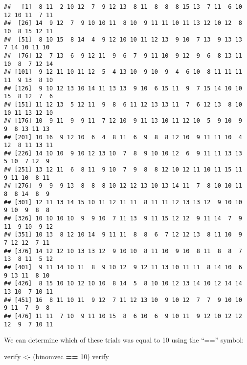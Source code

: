 \documentclass[
]{book}
\newenvironment{Shaded}{\begin{snugshade}}{\end{snugshade}}
\newcommand{\DecValTok}[1]{\textcolor[rgb]{0.00,0.00,0.81}{#1}}
\newcommand{\NormalTok}[1]{#1}
\newcommand{\OperatorTok}[1]{\textcolor[rgb]{0.81,0.36,0.00}{\textbf{#1}}}
\newcommand{\StringTok}[1]{\textcolor[rgb]{0.31,0.60,0.02}{#1}}
\begin{document}
\begin{verbatim}
##   [1]  8 11  2 10 12  7  9 12 13  8 11  8  8  8 15 13  7 11  6 10 12 10 11  7 11
##  [26] 14  9 12  7  9 10 10 11  8 10  9 11 11 10 11 13 12 10 12  8 10  8 15 12 11
##  [51]  8 10 15  8 14  4  9 12 10 10 11 12 13  9 10  7 13  9 13 13  7 14 10 11 10
##  [76] 12  7 13  6  9 12 11  9  6  7  9 11 10  9 12  9  6  8 13 11 10  8  7 12 14
## [101]  9 12 11 10 11 12  5  4 13 10  9 10  9  4  6 10  8 11 11 11 11  9 13  8 10
## [126]  9 10 12 13 10 14 11 13 13  9 10  6 15 11  9  7 15 14 10 10 15  8 12  7  6
## [151] 11 12 13  5 12 11  9  8  6 11 12 13 13 11  7  6 12 13  8 10 10 11 13 12 10
## [176] 10  9 11  9  9 11  7 12 10  9 11 13 10 11 12 10  5  9 10  9  9  8 13 11 13
## [201] 10 16  9 12 10  6  4  8 11  6  9  8  8 12 10  9 11 11 10  4 12  8 11 13 11
## [226] 14 10 10  9 10 12 13 10  7  8  9 10 10 12  6  9 11 11 13 13  5 10  7 12  9
## [251] 13 12 11  6  8 11  9 10  7  9  8  8 12 10 12 11 10 11 15 11  9 11 10  8 11
## [276]  9  9  9 13  8  8  8 10 12 12 13 10 13 14 11  7  8 10 10 11  8  8 14  8  9
## [301] 12 11 13 14 15 10 11 12 11 11  8 11 11 12 13 13 12  9 10 10  9 10  9  8  8
## [326] 10 10 10 10  9  9 10  7 11 13  9 11 15 12 12  9 11 14  7  9 11  9 10  9 12
## [351] 10 13  8 12 10 14  9 11 11  8  8  6  7 12 12 13  8 11 10  9  7 12 12  7 11
## [376] 14 12 12 10 13 13 12  9 10 10  8 11 10  9 10  8 11  8  8  7 13  8 11  5 12
## [401]  9 11 14 10 11  8  9 10 12  9 12 11 13 10 11 11  8 14 10  6  9 13 11  8 10
## [426]  8 15 10 10 12 10 10  8 14  5  8 10 10 12 13 14 10 12 14 14 13 10  7 10 11
## [451] 16  8 11 10 11  9 12  7 11 12 13 10  9 10 12  7  7  9 10 10  9 11  7  9  8
## [476] 11 11  7 10  9 11 10 15  8  6 10  6  9 10 11  9 12 10 12 12 12  9  7 10 11
\end{verbatim}

We can determine which of these trials was equal to 10 using the ``=='' symbol:

\begin{Shaded}
\begin{Highlighting}[]
\NormalTok{verify \textless{}{-}}\StringTok{ }\NormalTok{(binomvec }\OperatorTok{==}\StringTok{ }\DecValTok{10}\NormalTok{)}
\NormalTok{verify}
\end{Highlighting}
\end{Shaded}
\end{document}
